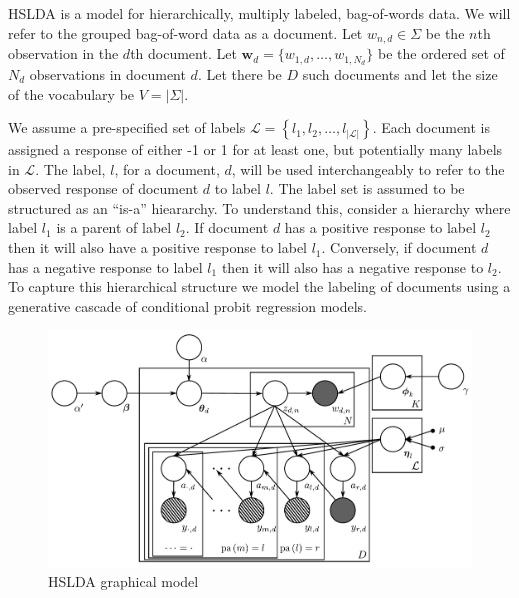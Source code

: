 
\label{sec:model} 

HSLDA is a model for hierarchically, multiply labeled, bag-of-words data.  We will refer to the grouped bag-of-word data as a document.  Let $w_{n,d} \in \Sigma$ be the $n$th observation in the $d$th document.  Let $\mathbf{w}_d = \{w_{1,d},\ldots,w_{1,N_d}\}$ be the ordered set of $N_d$ observations in document $d$.  Let there be $D$ such documents and let the size of the vocabulary be $V=|\Sigma|$.  

We assume a pre-specified set of labels $\mathcal{L}=\left\{ l_{1},l_{2},\ldots,l_{\left|\mathcal{L}\right|}\right\} $.
Each document is assigned a response of either -1 or 1 for at least
one, but potentially many labels in $\mathcal{L}$. The label, $l$,
for a document, $d$, will be used interchangeably to refer to the
observed response of document $d$ to label $l$. The label set is
assumed to be structured as an {}``is-a'' hieararchy.
To understand this, consider a hierarchy where label $l_{1}$ is a
parent of label $l_{2}$. If document $d$ has a positive response
to label $l_{2}$ then it will also have a positive response to label
$l_{1}$. Conversely, if document $d$ has a negative response to
label $l_{1}$ then it will also has a negative response to $l_{2}$.
To capture this hierarchical structure we model the labeling of documents
using a generative cascade of conditional probit regression models.

%
\begin{figure}[t]
 \centering \includegraphics[scale=0.4]{Graphical_Model-final} \caption{HSLDA graphical model}


\label{fig:example} 
\end{figure}


